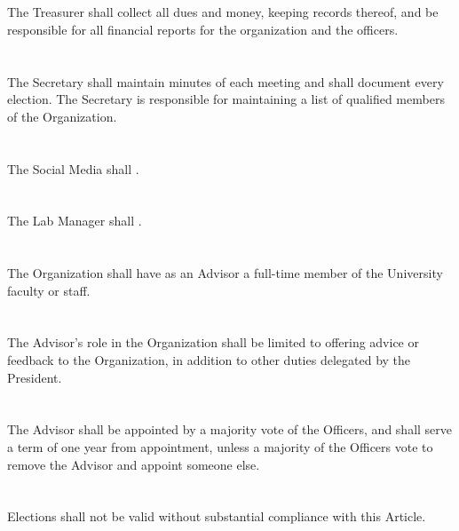 \documentclass[12pt]{cls/constitution}
\begin{document}
\section{}
The Treasurer shall collect all dues and money, keeping records thereof, and be responsible for all financial reports for the organization and the officers.

\section{}
The Secretary shall maintain minutes of each meeting and shall document every election. The Secretary is responsible for maintaining a list of qualified members of the Organization.

\section{}
The Social Media shall .

\section{}
The Lab Manager shall .

\section{}
The Organization shall have as an Advisor a full-time member of the University faculty or staff.

\section{}
The Advisor’s role in the Organization shall be limited to offering advice or feedback to the Organization, in addition to other duties delegated by the President.

\section{}
The Advisor shall be appointed by a majority vote of the Officers, and shall serve a term of one year from appointment, unless a majority of the Officers vote to remove the Advisor and appoint someone else. 


\section{}
Elections shall not be valid without substantial compliance with this Article. 
\end{document}
